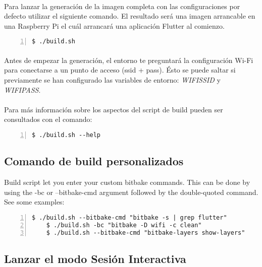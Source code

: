 \paragraph{}Para lanzar la generación de la imagen completa con las configuraciones por
defecto utilizar el siguiente comando. El resultado será una imagen arrancable en una
Raspberry Pi el cuál arrancará una aplicación Flutter al comienzo.

\begin{lstlisting}[style=consola, numbers=left]
    $ ./build.sh
\end{lstlisting}

\paragraph{}Antes de empezar la generación, el entorno te preguntará la configuración
Wi-Fi para conectarse a un punto de acceso (ssid + pass). Ésto se puede saltar si
previamente se han configurado las variables de entorno: \emph{WIFISSID} y \emph{WIFIPASS}.

\paragraph{}Para más información sobre los aspectos del script de build pueden ser
consultados con el comando:

\begin{lstlisting}[style=consola, numbers=left]
    $ ./build.sh --help
\end{lstlisting}

\subsection{Comando de build personalizados}

Build script let you enter your custom bitbake commands. This can be done by using the -bc or --bitbake-cmd argument followed by the double-quoted command. See some examples:

\begin{lstlisting}[style=consola, numbers=left]
    $ ./build.sh --bitbake-cmd "bitbake -s | grep flutter"
    $ ./build.sh -bc "bitbake -D wifi -c clean"
    $ ./build.sh --bitbake-cmd "bitbake-layers show-layers"
\end{lstlisting}

\subsection{Lanzar el modo Sesión Interactiva}

